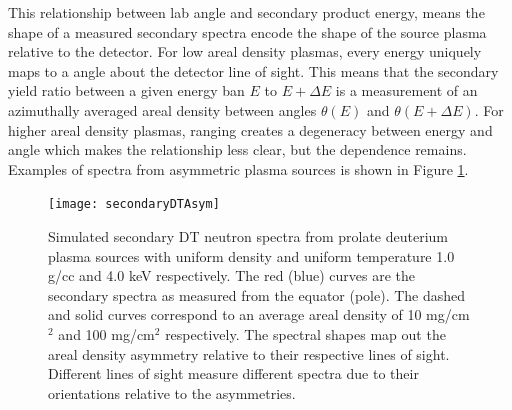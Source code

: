 	This relationship between lab angle and secondary product energy, means the shape of a measured secondary spectra encode the shape of the source plasma relative to the detector. For low areal density plasmas, every energy uniquely maps to a angle about the detector line of sight. This means that the secondary yield ratio between a given energy ban $E$ to $E+\Delta E$ is a measurement of an azimuthally averaged areal density between angles $\theta(E)$ and $\theta(E+\Delta E)$. For higher areal density plasmas, ranging creates a degeneracy between energy and angle which makes the relationship less clear, but the dependence remains. Examples of spectra from asymmetric plasma sources is shown in Figure \ref{secondaryDTAsym}.
	
	\begin{figure}[h!]
		\centering
		\texttt{[image: secondaryDTAsym]}
		\caption[Secondary DT neutron spectra from asymmetric plasmas]{ Simulated secondary DT neutron spectra from prolate deuterium plasma sources with uniform density and uniform temperature 1.0 g/cc and 4.0 keV respectively. The red (blue) curves are the secondary spectra as measured from the equator (pole). The dashed and solid curves correspond to an average areal density of 10 mg/cm$^2$ and 100 mg/cm$^2$ respectively. The spectral shapes map out the areal density asymmetry relative to their respective lines of sight. Different lines of sight measure different spectra due to their orientations relative to the asymmetries.    }
		\label{secondaryDTAsym}
	\end{figure}



